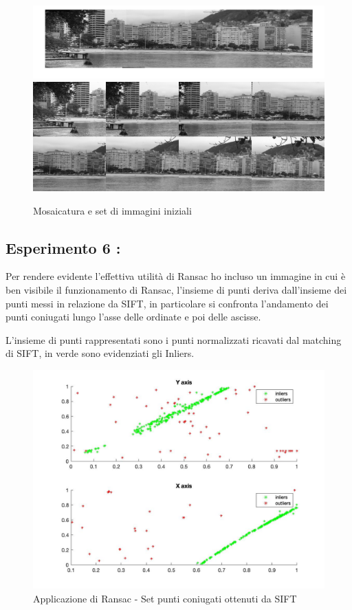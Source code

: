 \documentclass[11pt, oneside]{article}   	%
\begin{document}
\begin{figure}[H]
\includegraphics[width=\textwidth]{rio.jpg}
\includegraphics[width=\textwidth]{foto_mosaico_rio.png}
\caption{Mosaicatura e set di immagini iniziali}
\end{figure}




\subsection{Esperimento 6 :}

Per rendere evidente l'effettiva utilità di Ransac ho incluso un immagine in cui è ben visibile  il funzionamento di Ransac, l'insieme di punti deriva dall'insieme dei punti messi in relazione da SIFT, in particolare si confronta l'andamento dei punti coniugati lungo l'asse delle ordinate e poi delle ascisse.


L'insieme di punti rappresentati sono i punti normalizzati ricavati dal matching di SIFT, in verde sono evidenziati gli Inliers.

\begin{figure}[H]
\includegraphics[width=\textwidth]{rio_out_inliers_ultima_iterazione.jpg}
\caption{Applicazione di Ransac - Set punti coniugati ottenuti da SIFT }
\label{fig:ransac_schematic}
\end{figure}
\end{document}
